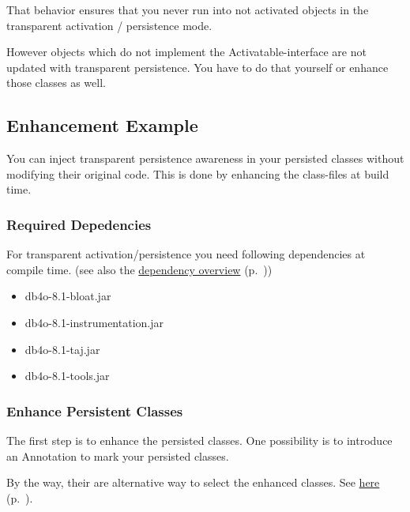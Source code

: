 That behavior ensures that you never run into not activated objects in the transparent activation / persistence mode.

However objects which do not implement the Activatable-interface are not updated with transparent persistence. You have to do that yourself or enhance those classes as well.

\subsection{Enhancement Example}
\label{ref:basics-transparentpersistence-ta-enhanced-example}

You can inject transparent persistence awareness in your persisted classes without modifying their original code. This is done by enhancing the class-files at build time.

\subsubsection{Required Depedencies}
\label{ref:basics-transparentpersistence-ta-enhanced-example:dependencies}

For transparent activation/persistence you need following dependencies at compile time. (see also the \hyperref[ref:dependency-overview]{dependency overview} (p.~\pageref{ref:dependency-overview}))

\begin{itemize}
\item db4o-8.1-bloat.jar
\item db4o-8.1-instrumentation.jar
\item db4o-8.1-taj.jar
\item db4o-8.1-tools.jar
\end{itemize}

\subsubsection{Enhance Persistent Classes}
\label{ref:basics-transparentpersistence-ta-enhanced-example:enhance}

The first step is to enhance the persisted classes. One possibility is to introduce an Annotation to mark your persisted classes.

By the way, their are alternative way to select the enhanced classes. See  \hyperref[ref:advanced-topics-enhancement-tools-enhancement-for-java-build-time-enhancement]{here} (p.~\pageref{ref:advanced-topics-enhancement-tools-enhancement-for-java-build-time-enhancement}).

